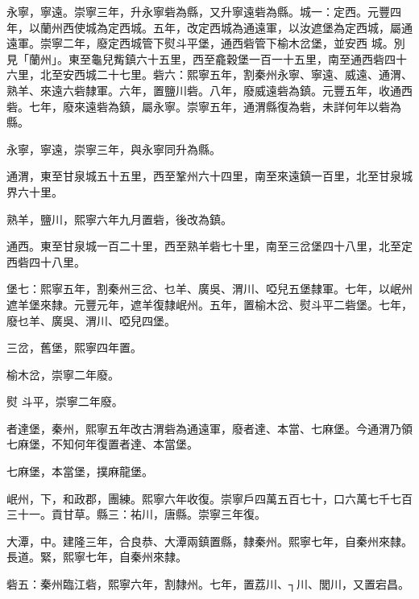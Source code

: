 \begin{pinyinscope}
 永寧，寧遠。崇寧三年，升永寧砦為縣，又升寧遠砦為縣。城一：定西。元豐四年，以蘭州西使城為定西城。五年，改定西城為通遠軍，以汝遮堡為定西城，屬通遠軍。崇寧二年，廢定西城管下熨斗平堡，通西砦管下榆木岔堡，並安西
 城。別見「蘭州」。東至龜兒觜鎮六十五里，西至龕穀堡一百一十五里，南至通西砦四十六里，北至安西城二十七里。砦六：熙寧五年，割秦州永寧、寧遠、威遠、通渭、熟羊、來遠六砦隸軍。六年，置鹽川砦。八年，廢威遠砦為鎮。元豐五年，收通西砦。七年，廢來遠砦為鎮，屬永寧。崇寧五年，通渭縣復為砦，未詳何年以砦為縣。



 永寧，寧遠，崇寧三年，與永寧同升為縣。



 通渭，東至甘泉城五十五里，西至鞏州六十四里，南至來遠鎮一百里，北至甘泉城界六十里。



 熟羊，鹽川，熙寧六年九月置砦，後改為鎮。



 通西。東至甘泉城一百二十里，西至熟羊砦七十里，南至三岔堡四十八里，北至定西砦四十八里。



 堡七：熙寧五年，割秦州三岔、乜羊、廣吳、渭川、啞兒五堡隸軍。七年，以岷州遮羊堡來隸。元豐元年，遮羊復隸岷州。五年，置榆木岔、熨斗平二砦堡。七年，廢乜羊、廣吳、渭川、啞兒四堡。



 三岔，舊堡，熙寧四年置。



 榆木岔，崇寧二年廢。



 熨
 斗平，崇寧二年廢。



 者達堡，秦州，熙寧五年改古渭砦為通遠軍，廢者達、本當、七麻堡。今通渭乃領七麻堡，不知何年復置者達、本當堡。



 七麻堡，本當堡，撲麻龍堡。



 岷州，下，和政郡，團練。熙寧六年收復。崇寧戶四萬五百七十，口六萬七千七百三十一。貢甘草。縣三：祐川，唐縣。崇寧三年復。



 大潭，中。建隆三年，合良恭、大潭兩鎮置縣，隸秦州。熙寧七年，自秦州來隸。長道。緊，熙寧七年，自秦州來隸。



 砦五：秦州臨江砦，熙寧六年，割隸州。七年，置荔川、┐川、閭川，又置宕昌。




\end{pinyinscope}

